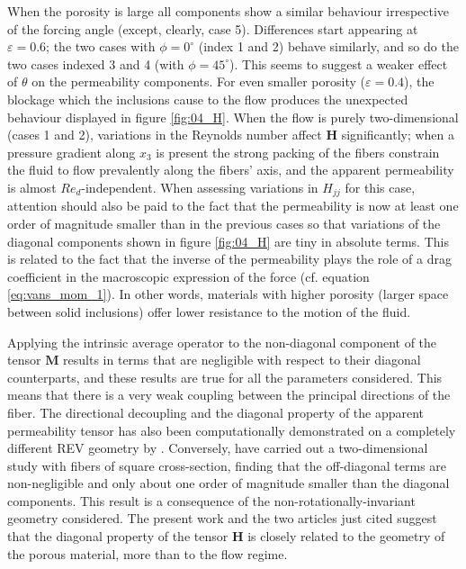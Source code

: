 When the porosity is large all components show a similar behaviour irrespective of the forcing angle (except, clearly, case 5). Differences 
start appearing at $\varepsilon=0.6$; the two cases with $\phi=0^{\circ}$ (index 1 and 2) behave similarly, and so do the two cases indexed 3 
and 4 (with $\phi=45^{\circ}$). This seems to suggest a weaker effect of $\theta$ on the permeability components.  For even smaller porosity ($
\varepsilon=0.4$), the blockage which the inclusions cause to the flow produces the unexpected behaviour displayed in figure \ref{fig:04_H}. 
When the flow is purely two-dimensional (cases 1 and 2), variations in the Reynolds number affect $\mathbf{H}$ significantly; when a pressure 
gradient along $x_3$ is present the strong packing of the fibers constrain the fluid to flow prevalently along the fibers' axis, and the 
apparent permeability is almost $Re_d$-independent. When assessing variations in $H_{jj}$ for this case, attention should also be paid to the 
fact that the permeability is now at least one order of magnitude smaller than in the previous cases so that variations of the diagonal 
components shown in figure \ref{fig:04_H} are tiny in absolute terms.  This is related to the fact that  the  inverse of the permeability  
plays the role of a drag coefficient in the macroscopic expression of the force  (cf. equation \eqref{eq:vans_mom_1}).  In other words, 
materials with higher porosity (larger space between solid inclusions) offer lower resistance to the motion of the fluid.


Applying the intrinsic average operator to the non-diagonal component of the tensor $\mathbf{M}$ results in terms that are negligible with respect to their diagonal counterparts, and these results are true for all the parameters considered. This means that there is a very weak coupling between the principal directions of the fiber.
The directional decoupling and the diagonal property of the apparent permeability tensor has also been computationally demonstrated
on a completely different REV geometry by \citet{soulaine2014}. Conversely,
\citet{lasseux} have carried out a two-dimensional study with fibers of square cross-section, finding that the off-diagonal terms are 
non-negligible and only about
one order of magnitude smaller than the diagonal components. This result is a consequence of the non-rotationally-invariant  geometry  
considered.  The present work and the two articles just cited suggest that the  diagonal property of the tensor $\mathbf{H}$   is closely
related to the geometry of the porous material, more  than to the flow regime.  



